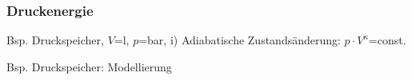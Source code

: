 \begin{frame}
  \frametitle{Druckenergie}
  \begin{block}{Bsp. Druckspeicher, $V$=\unit[10]{l}, $p$=\unit[4]{bar}, i)}
    Adiabatische Zustands\"anderung: $p \cdot V^\kappa$=const.
  \end{block}
  \begin{block}{Bsp. Druckspeicher: Modellierung}
  \end{block}
  

  \ifteacher%
  \else%
    \vspace*{-0.10\baselineskip}\rotatebox[origin=lB]{180}{%
    \resizebox{0.9\linewidth}{!}{\parbox[t]{3.95\linewidth}{%
    \ %
    }}}
  \fi%

\end{frame}


